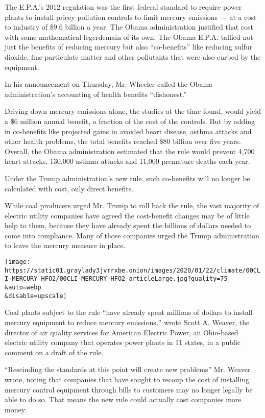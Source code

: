The E.P.A.'s 2012 regulation was the first federal standard to require
power plants to install pricey pollution controls to limit mercury
emissions --- at a cost to industry of \$9.6 billion a year. The Obama
administration justified that cost with some mathematical legerdemain of
its own. The Obama E.P.A. tallied not just the benefits of reducing
mercury but also ``co-benefits'' like reducing sulfur dioxide, fine
particulate matter and other pollutants that were also curbed by the
equipment.

In his announcement on Thursday, Mr. Wheeler called the Obama
administration's accounting of health benefits ``dishonest.''

Driving down mercury emissions alone, the studies at the time found,
would yield a \$6 million annual benefit, a fraction of the cost of the
controls. But by adding in co-benefits like projected gains in avoided
heart disease, asthma attacks and other health problems, the total
benefits reached \$80 billion over five years. Overall, the Obama
administration estimated that the rule would prevent 4,700 heart
attacks, 130,000 asthma attacks and 11,000 premature deaths each year.

Under the Trump administration's new rule, such co-benefits will no
longer be calculated with cost, only direct benefits.

While coal producers urged Mr. Trump to roll back the rule, the vast
majority of electric utility companies have agreed the cost-benefit
changes may be of little help to them, because they have already spent
the billions of dollars needed to come into compliance. Many of those
companies urged the Trump administration to leave the mercury measure in
place.

\texttt{[image: https://static01.graylady3jvrrxbe.onion/images/2020/01/22/climate/00CLI-MERCURY-HFO2/00CLI-MERCURY-HFO2-articleLarge.jpg?quality=75\\\&auto=webp\\\&disable=upscale]}

Coal plants subject to the rule ``have already spent millions of dollars
to install mercury equipment to reduce mercury emissions,'' wrote Scott
A. Weaver, the director of air quality services for American Electric
Power, an Ohio-based electric utility company that operates power plants
in 11 states, in a public comment on a draft of the rule.

``Rescinding the standards at this point will create new problems'' Mr.
Weaver wrote, noting that companies that have sought to recoup the cost
of installing mercury control equipment through bills to customers may
no longer legally be able to do so. That means the new rule could
actually cost companies more money.


